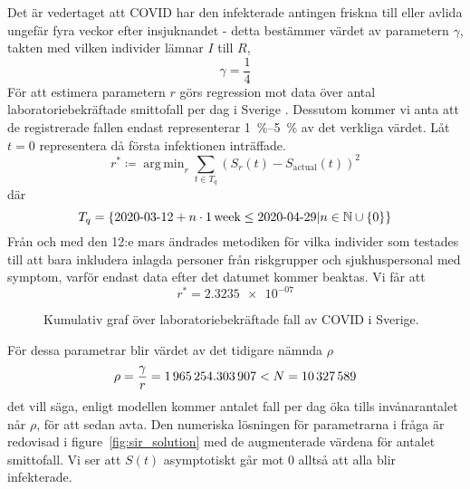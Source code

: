 \documentclass{article}
\DeclareMathOperator*{\argmin}{arg\,min}
\newcommand\covid{COVID\nobreakdash-19}
\begin{document}
Det är vedertaget att \covid{} har den infekterade antingen
friskna till eller avlida ungefär fyra veckor efter insjuknandet -
detta bestämmer värdet av parametern $\gamma$,
takten med vilken individer lämnar $I$ till $R$,
$$ \gamma = \frac14 $$
För att estimera parametern $r$ görs regression mot data över
antal laboratoriebekräftade smittofall per dag i Sverige
\cite{folkhalso}.
Dessutom kommer vi anta att de registrerade fallen endast representerar
\SIrange{1}{5}{\percent} av det verkliga värdet.
Låt $t=0$ representera  då första infektionen inträffade.
$$ r^* \coloneqq \argmin_r \sum_{t \in T_q} (S_r(t) - S_{\text{actual}}(t))^2 $$
där
$$ T_q = \left\{\text{2020-03-12} + n \cdot 1 \text{\,week} \le \text{2020-04-29} \vert n \in \mathbb N \cup \{0\} \right\} $$
Från och med den 12:e mars ändrades metodiken för vilka individer
som testades till att bara inkludera inlagda personer från riskgrupper
och sjukhuspersonal med symptom,
varför endast data efter det datumet kommer beaktas.
Vi får att
$$ r^* = \num{2.3235e-07} $$


\begin{figure}
	\centering
	\caption{Kumulativ graf över laboratoriebekräftade fall av \covid{} i Sverige.
	\autocite{folkhalso} \label{fig:cum_cases}}
\end{figure}

För dessa parametrar blir värdet av det tidigare nämnda $\rho$
\def\rhoVal{1965254.303907}
$$ \rho = \frac\gamma r = \num{\rhoVal} < N = \num{\N} $$
det vill säga,
enligt modellen kommer antalet fall per dag öka tills
invånarantalet når $\rho$, för att sedan avta.
Den numeriska lösningen för parametrarna i fråga är redovisad i figure~\ref{fig:sir_solution}
med de augmenterade värdena för antalet smittofall.
Vi ser att $S(t)$ asymptotiskt går mot 0 alltså att alla blir infekterade.
\end{document}
